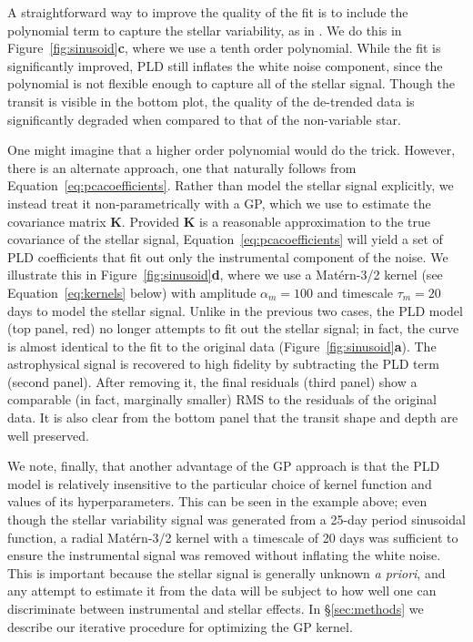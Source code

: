 \documentclass[]{emulateapj}
\begin{document}
A straightforward way to improve the quality of the fit is to include the polynomial
term to capture the stellar variability, as in \cite{DEM15}. We do this in Figure~\ref{fig:sinusoid}\textbf{c}, 
where we use a tenth order polynomial. While the fit is significantly
improved, PLD still inflates the white noise component, since the polynomial is 
not flexible enough to capture all of the stellar signal. Though the transit is
visible in the bottom plot, the quality of the de-trended data is significantly
degraded when compared to that of the non-variable star.

One might imagine that a higher order polynomial would do the trick. However, there
is an alternate approach, one that naturally follows from Equation~\ref{eq:pcacoefficients}.
Rather than model the stellar signal explicitly, we instead treat it non-parametrically
with a GP, which we use to estimate the covariance matrix $\mathbf{K}$. Provided
$\mathbf{K}$ is a reasonable approximation to the true covariance of the stellar signal,
Equation~\ref{eq:pcacoefficients} will yield a set of PLD coefficients that 
fit out only the instrumental component of the noise. We illustrate this in 
Figure~\ref{fig:sinusoid}\textbf{d}, where we use a Mat\'ern-3/2 kernel 
(see Equation~\ref{eq:kernels} below) with amplitude $\alpha_m = 100$ and timescale
$\tau_m = 20$ days to model the stellar signal. Unlike in the previous two cases,
the PLD model (top panel, red) no longer attempts to fit out the stellar signal; in 
fact, the curve is almost identical to the fit to the original data 
(Figure~\ref{fig:sinusoid}\textbf{a}). The astrophysical signal is
recovered to high fidelity by subtracting the PLD term (second panel). After removing it,
the final residuals (third panel) show a comparable (in fact, marginally smaller) RMS to the
residuals of the original data. It is also clear from the bottom panel that the transit 
shape and depth are well preserved.

We note, finally, that another advantage of the GP approach is that the PLD model is
relatively insensitive to the particular choice of kernel function and values of its
hyperparameters. This can be seen in the example above; even though the stellar
variability signal was generated from a 25-day period sinusoidal function, a radial
Mat\'ern-3/2 kernel with a timescale of 20 days was sufficient to ensure the instrumental
signal was removed without inflating the white noise. This is important because the
stellar signal is generally unknown \emph{a priori}, and any attempt to estimate it from the data
will be subject to how well one can discriminate between instrumental and stellar effects.
In \S\ref{sec:methods} we describe our iterative procedure for optimizing the GP kernel.
\end{document}
